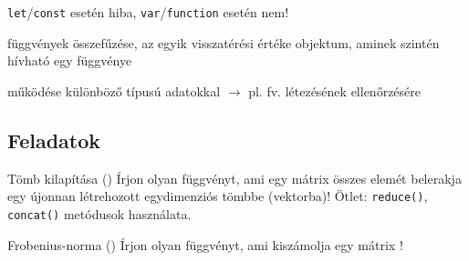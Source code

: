 \begin{frame}
  \footnotesize
  \begin{exampleblock}{ \texttt{let}/\texttt{const} esetén hiba, \texttt{var}/\texttt{function} esetén nem!}
      \scriptsize
      \vspace{-0.3cm}
      
      \vspace{-0.3cm}
  \end{exampleblock}
\end{frame}

\begin{frame}
  \begin{exampleblock}{ függvények összefűzése, az egyik visszatérési értéke objektum, aminek szintén hívható egy függvénye}
      \footnotesize
      
  \end{exampleblock}
\end{frame}

\begin{frame}
  \begin{exampleblock}{ működése különböző típusú adatokkal $\to$ pl. fv. létezésének ellenőrzésére}
      
  \end{exampleblock}
\end{frame}

\subsection{Feladatok}

\begin{frame}
  \begin{exampleblock}{Tömb kilapítása ()}
    Írjon olyan függvényt, ami egy mátrix összes elemét belerakja egy újonnan létrehozott egydimenziós tömbbe (vektorba)! Ötlet: \texttt{reduce()}, \texttt{concat()} metódusok használata.
  \end{exampleblock}
  \vfill
  \begin{exampleblock}{Frobenius-norma ()}
    Írjon olyan függvényt, ami kiszámolja egy mátrix !
  \end{exampleblock}
\end{frame}


